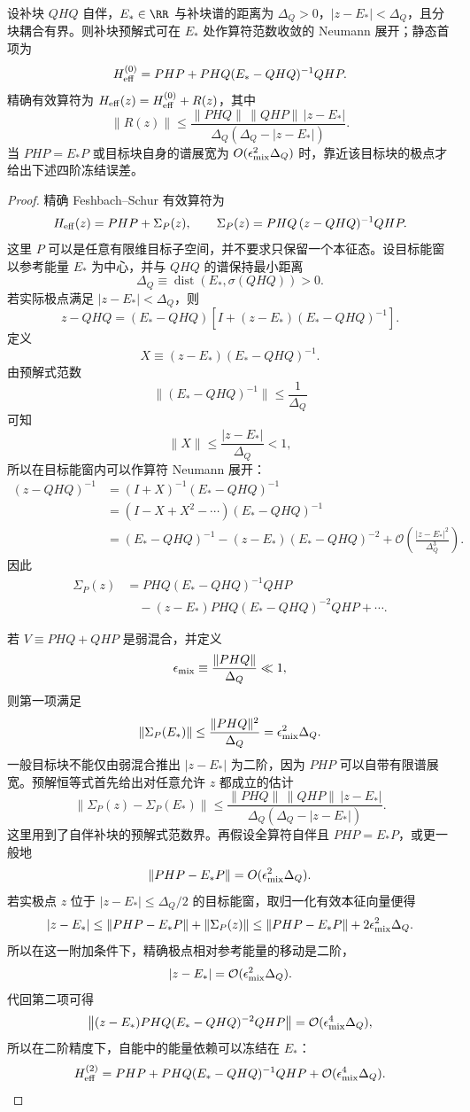 \begin{proposition}[有谱隙的静态有效算符展开]
设补块 $QHQ$ 自伴，$E_*\in\RR$ 与补块谱的距离为 $\Delta_Q>0$，$|z-E_*|<\Delta_Q$，且分块耦合有界。则补块预解式可在 $E_*$ 处作算符范数收敛的 Neumann 展开；静态首项为
\[
H_{\rm eff}^{(0)}=PHP+PHQ(E_*-QHQ)^{-1}QHP.
\]
精确有效算符为 $H_{\rm eff}(z)=H_{\rm eff}^{(0)}+R(z)$，其中
\[
\|R(z)\|\le
\frac{\|PHQ\|\,\|QHP\|\,|z-E_*|}
{\Delta_Q(\Delta_Q-|z-E_*|)}.
\]
当 $PHP=E_*P$ 或目标块自身的谱展宽为 $O(\epsilon_{\rm mix}^2\Delta_Q)$ 时，靠近该目标块的极点才给出下述四阶冻结误差。
\end{proposition}
\begin{proof}
精确 Feshbach--Schur 有效算符为
\[
H_{\rm eff}(z)
=
PHP+\Sigma_P(z),
\qquad
\Sigma_P(z)
=
PHQ\,(z-QHQ)^{-1}QHP.
\]
这里 \(P\) 可以是任意有限维目标子空间，并不要求只保留一个本征态。设目标能窗以参考能量 \(E_*\) 为中心，并与 \(QHQ\) 的谱保持最小距离
\[
\Delta_Q
\equiv
\operatorname{dist}\!\left(E_*,\sigma(QHQ)\right)>0.
\]
若实际极点满足 \(|z-E_*|<\Delta_Q\)，则
\[
z-QHQ
=
(E_*-QHQ)
\left[
I+(z-E_*)(E_*-QHQ)^{-1}
\right].
\]
定义
\[
X\equiv
(z-E_*)(E_*-QHQ)^{-1}.
\]
由预解式范数
\[
\|(E_*-QHQ)^{-1}\|
\le\frac1{\Delta_Q}
\]
可知
\[
\|X\|
\le\frac{|z-E_*|}{\Delta_Q}<1,
\]
所以在目标能窗内可以作算符 Neumann 展开：
\begin{align*}
(z-QHQ)^{-1}
&=
\left(I+X\right)^{-1}(E_*-QHQ)^{-1}\\
&=
\left(I-X+X^2-\cdots\right)
(E_*-QHQ)^{-1}\\
&=
(E_*-QHQ)^{-1}
-(z-E_*)(E_*-QHQ)^{-2}
+\mathcal O\!\left(
\frac{|z-E_*|^2}{\Delta_Q^3}
\right).
\end{align*}
因此
\begin{align*}
\Sigma_P(z)
&=
PHQ(E_*-QHQ)^{-1}QHP\\
&\quad
-(z-E_*)
PHQ(E_*-QHQ)^{-2}QHP
+\cdots .
\end{align*}

若 \(V\equiv PHQ+QHP\) 是弱混合，并定义
\[
\epsilon_{\rm mix}
\equiv
\frac{\|PHQ\|}{\Delta_Q}\ll1,
\]
则第一项满足
\[
\|\Sigma_P(E_*)\|
\le
\frac{\|PHQ\|^2}{\Delta_Q}
=
\epsilon_{\rm mix}^2\Delta_Q.
\]
一般目标块不能仅由弱混合推出 $|z-E_*|$ 为二阶，因为 $PHP$ 可以自带有限谱展宽。预解恒等式首先给出对任意允许 $z$ 都成立的估计
\[
\|\Sigma_P(z)-\Sigma_P(E_*)\|
\le\frac{\|PHQ\|\,\|QHP\|\,|z-E_*|}
{\Delta_Q(\Delta_Q-|z-E_*|)}.
\]
这里用到了自伴补块的预解式范数界。再假设全算符自伴且 $PHP=E_*P$，或更一般地
\[
\|PHP-E_*P\|=O(\epsilon_{\rm mix}^2\Delta_Q).
\]
若实极点 $z$ 位于 $|z-E_*|\le\Delta_Q/2$ 的目标能窗，取归一化有效本征向量便得
\[
|z-E_*|\le\|PHP-E_*P\|+\|\Sigma_P(z)\|
\le\|PHP-E_*P\|+2\epsilon_{\rm mix}^2\Delta_Q.
\]
所以在这一附加条件下，精确极点相对参考能量的移动是二阶，
\[
|z-E_*|
=
\mathcal O(\epsilon_{\rm mix}^2\Delta_Q).
\]
代回第二项可得
\[
\left\|
(z-E_*)
PHQ(E_*-QHQ)^{-2}QHP
\right\|
=
\mathcal O(\epsilon_{\rm mix}^4\Delta_Q),
\]
所以在二阶精度下，自能中的能量依赖可以冻结在 \(E_*\)：
\[
H_{\rm eff}^{(2)}
=
PHP
+
PHQ(E_*-QHQ)^{-1}QHP
+
\mathcal O(\epsilon_{\rm mix}^4\Delta_Q).
\]


\end{proof}
